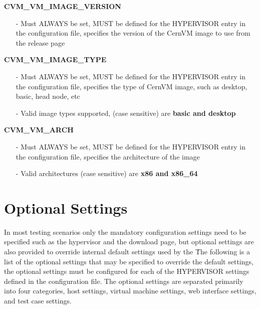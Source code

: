 \begin{description}
\item {\bf CVM\_VM\_IMAGE\_VERSION}
		\begin{itemize}
		\item[-]	Must ALWAYS be set,  MUST be defined for the HYPERVISOR entry in the configuration
				file, specifies the version of the CernVM image to use from the release page
		\end{itemize}
	
\item {\bf CVM\_VM\_IMAGE\_TYPE}
		\begin{itemize}
		\item[-]	Must ALWAYS be set,  MUST be defined for the HYPERVISOR entry in the configuration
				file, specifies the type of CernVM image, such as desktop, basic, head node, etc
		\item[-]	Valid image types supported, (case sensitive) are {\bf basic and desktop}
		\end{itemize}
		
\item {\bf CVM\_VM\_ARCH}
		\begin{itemize}
		\item[-]	Must ALWAYS be set, MUST be defined for the HYPERVISOR entry in the configuration
				file, specifies the architecture of the \cernvm image
		\item[-]	Valid architectures (case sensitive) are {\bf x86 and x86\_64}
		\end{itemize}


\end{description}




\section{Optional Settings}
\label{sec:optionalsettings}

In most testing scenarios only the mandatory configuration settings need to be specified such as the hypervisor and 
the download page, but optional settings are also provided to override internal default settings used by the 
\cernvmtestframework\. The following is a list of the optional settings that may be specified to override the default
settings, the optional settings must be configured for each of the HYPERVISOR settings defined in the configuration file.
The optional settings are separated primarily into four categories, host settings, virtual machine settings, web interface
settings, and test case settings. 

